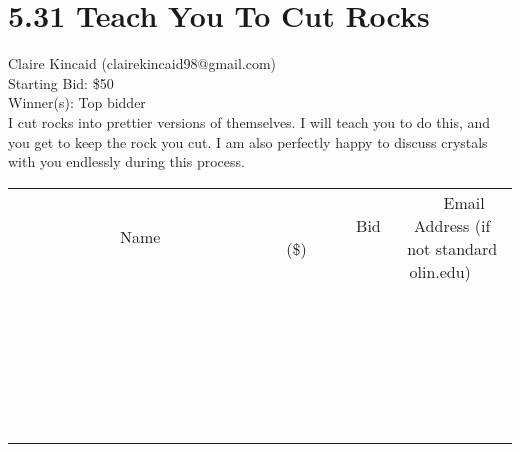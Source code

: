 \documentclass[11pt]{article}
\begin{document}
\section*{5.31 Teach You To Cut Rocks}
Claire Kincaid (clairekincaid98@gmail.com) \\
Starting Bid: \$50 \\
Winner(s): 
Top bidder \\
I cut rocks into prettier versions of themselves.  I will teach you to do this, and you get to keep the rock you cut.  I am also perfectly happy to discuss crystals with you endlessly during this process. \\[6ex]
\begin{tabular}{c c c}
~~~~~~~~~~~~~Name~~~~~~~~~~~~~ & ~~~~~~~~~Bid (\$)~~~~~~~~~ & ~~~Email Address (if not standard olin.edu)~~~ \\
 & & \\
\hline
 & & \\
\hline
 & & \\
\hline
 & & \\
\hline
 & & \\
\hline
 & & \\
\hline
 & & \\
\hline
 & & \\
\hline
 & & \\
\hline
 & & \\
\hline
 & & \\
\hline
 & & \\
\hline
 & & \\
\hline
 & & \\
\hline
 & & \\
\hline
 & & \\
\hline
 & & \\
\hline
 & & \\
\hline
 & & \\
\hline
 & & \\
\hline
 & & \\
\hline
 & & \\
\hline
 & & \\
\hline
 & & \\
\hline
 & & \\
\hline
 & & \\
\hline
\end{tabular}
\clearpage
\end{document}
